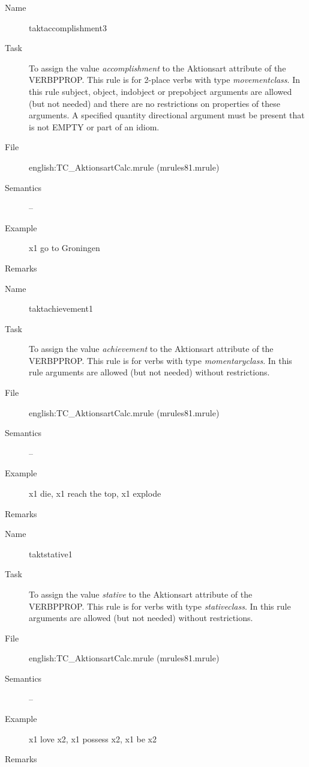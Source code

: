 \begin{description}
\vspace{1 cm}
\begin{description}
\item[Name] taktaccomplishment3
\item[Task] To assign the value {\em accomplishment\/} to the Aktionsart 
attribute of the 
VERBPPROP. This rule is for 2-place verbs with type {\em movementclass}.
In this rule subject, object, indobject  or prepobject arguments are
allowed (but not needed) and there are no restrictions 
on properties of these arguments. A specified quantity directional argument
must be present that is not EMPTY or part of an idiom.
\item[File] english:TC\_AktionsartCalc.mrule (mrules81.mrule)
\item[Semantics] --
\item[Example] x1 go to Groningen
\item[Remarks]
\end{description}

\vspace{1 cm}
\begin{description}
\item[Name] taktachievement1
\item[Task] To assign the value {\em achievement\/} to the Aktionsart attribute 
of the VERBPPROP. This rule is for verbs with type {\em momentaryclass}.
In this rule arguments are allowed (but not needed) without restrictions.
\item[File] english:TC\_AktionsartCalc.mrule (mrules81.mrule)
\item[Semantics] --
\item[Example] x1 die, x1 reach the top, x1 explode
\item[Remarks]
\end{description}

\vspace{1 cm}
\begin{description}
\item[Name] taktstative1
\item[Task] To assign the value {\em stative\/} to the Aktionsart attribute of 
the VERBPPROP. This rule is for verbs with type {\em stativeclass}.
In this rule arguments are allowed (but not needed) without restrictions.
\item[File] english:TC\_AktionsartCalc.mrule (mrules81.mrule)
\item[Semantics] --
\item[Example] x1 love x2, x1 possess x2, x1 be x2
\item[Remarks]
\end{description}


\end{description}

